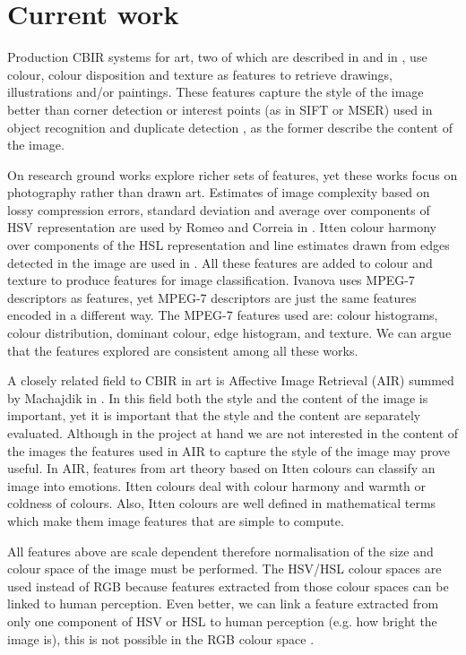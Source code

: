 \documentclass[a4paper]{article}
\begin{document}
\section{Current work}

Production CBIR systems for art, two of which are described in \cite{cfsp12air}
and in \cite{ymvz03tree}, use colour, colour disposition and texture as
features to retrieve drawings, illustrations and/or paintings.  These features
capture the style of the image better than corner detection or interest points
(as in SIFT or MSER) used in object recognition and duplicate detection
\cite{szel11book}, as the former describe the content of the image.

On research ground works explore richer sets of features, yet these works focus
on photography rather than drawn art.  Estimates of image complexity based on
lossy compression errors, standard deviation and average over components of HSV
representation are used by Romeo and Correia in
\cite{jma12clas,cmrc13fs,rmc12ajs}.  Itten colour harmony over components of
the HSL representation and line estimates drawn from edges detected in the
image are used in \cite{mach10clas}.  All these features are added to colour
and texture to produce features for image classification.  Ivanova
\cite{isv12mpeg} uses MPEG-7 descriptors as features, yet MPEG-7 descriptors
are just the same features encoded in a different way.  The MPEG-7 features
used are: colour histograms, colour distribution, dominant colour, edge
histogram, and texture.  We can argue that the features explored are consistent
among all these works.

A closely related field to CBIR in art is Affective Image Retrieval (AIR)
summed by Machajdik in \cite{mach10ua,mach10clas}.  In this field both the
style and the content of the image is important, yet it is important that the
style and the content are separately evaluated.  Although in the project at
hand we are not interested in the content of the images the features used in
AIR to capture the style of the image may prove useful.  In AIR, features from
art theory based on Itten colours can classify an image into emotions.  Itten
colours deal with colour harmony and warmth or coldness of colours.  Also,
Itten colours are well defined in mathematical terms which make them image
features that are simple to compute.

All features above are scale dependent \cite{rmc12ajs,mach10clas} therefore
normalisation of the size and colour space of the image must be performed.  The
HSV/HSL colour spaces are used instead of RGB because features extracted from
those colour spaces can be linked to human perception.  Even better, we can
link a feature extracted from only one component of HSV or HSL to human
perception (e.g. how bright the image is), this is not possible in the RGB
colour space \cite{rmc12ajs}.
\end{document}
